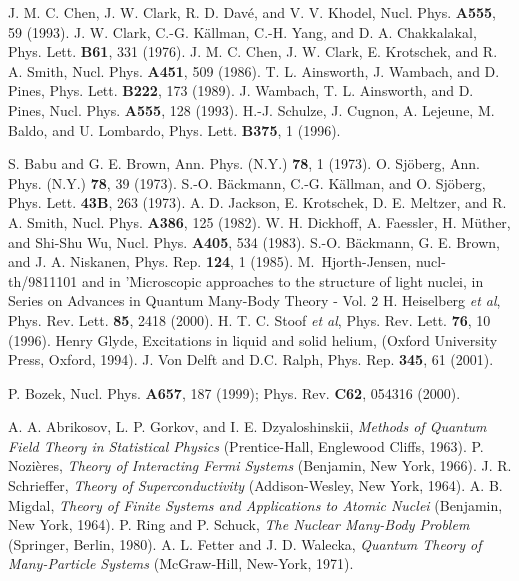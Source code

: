 \documentclass{svmult}
\begin{document}
\begin{thebibliography}{}


 J. M. C. Chen, J. W. Clark, R. D. Dav\'e, and V. V. Khodel,
 Nucl. Phys. {\bf A555}, 59 (1993).
 J. W. Clark, C.-G. K\"allman, C.-H. Yang, and D. A. Chakkalakal,
 Phys. Lett. {\bf B61}, 331 (1976).
 J. M. C. Chen, J. W. Clark, E. Krotschek, and R. A. Smith,
 Nucl. Phys. {\bf A451}, 509 (1986).
 T. L. Ainsworth, J. Wambach, and D. Pines,
 Phys. Lett. {\bf B222}, 173 (1989).
 J. Wambach, T. L. Ainsworth, and D. Pines,
 Nucl. Phys. {\bf A555}, 128 (1993).
 H.-J. Schulze, J. Cugnon, A. Lejeune, M. Baldo, and U. Lombardo,
 Phys. Lett. {\bf B375}, 1 (1996).

 S. Babu and G. E. Brown,
 Ann. Phys. (N.Y.) {\bf 78}, 1 (1973).
 O. Sj\"oberg,
 Ann. Phys. (N.Y.) {\bf 78}, 39 (1973).
 S.-O. B\"ackmann, C.-G. K\"allman, and O. Sj\"oberg,
 Phys. Lett. {\bf 43B}, 263 (1973).
 A. D. Jackson, E. Krotschek, D. E. Meltzer, and R. A. Smith,
 Nucl. Phys. {\bf A386}, 125 (1982).
 W. H. Dickhoff, A. Faessler, H. M\"uther, and Shi-Shu Wu,
 Nucl. Phys. {\bf A405}, 534 (1983).
 S.-O. B\"ackmann, G. E. Brown, and J. A. Niskanen,
 Phys. Rep. {\bf 124}, 1 (1985).
 M.~Hjorth-Jensen, nucl-th/9811101 and in 
'Microscopic approaches to the structure of light nuclei, in 
Series on Advances in Quantum Many-Body Theory - Vol. 2
H. Heiselberg {\em et al}, Phys. Rev. Lett. {\bf 85}, 2418 (2000). 
H. T. C. Stoof {\em et al}, Phys. Rev. Lett. {\bf 76}, 10 (1996).
 Henry Glyde, Excitations in liquid and solid helium, 
(Oxford University Press, Oxford, 1994). 
 J. Von Delft and D.C. Ralph, Phys. Rep. {\bf 345}, 61 (2001).


 P. Bozek,
 Nucl. Phys. {\bf A657}, 187 (1999); Phys. Rev. {\bf C62}, 054316 (2000).

 A. A. Abrikosov, L. P. Gorkov, and I. E. Dzyaloshinskii,
 {\it Methods of Quantum Field Theory in Statistical Physics}
 (Prentice-Hall, Englewood Cliffs, 1963).
 P. Nozi\`{e}res, 
 {\em Theory of Interacting Fermi Systems}
 (Benjamin, New York, 1966).
 J. R. Schrieffer, 
 {\it Theory of Superconductivity}
 (Addison-Wesley, New York, 1964).
 A. B. Migdal, 
 {\it Theory of Finite Systems and Applications to Atomic Nuclei}
 (Benjamin, New York, 1964). 
 P. Ring and P. Schuck,  
 {\em The Nuclear Many-Body Problem}
 (Springer, Berlin, 1980).
 A. L. Fetter and J. D. Walecka, 
 {\it Quantum Theory of Many-Particle Systems} 
 (McGraw-Hill, New-York, 1971).



\end{thebibliography}
\end{document}
